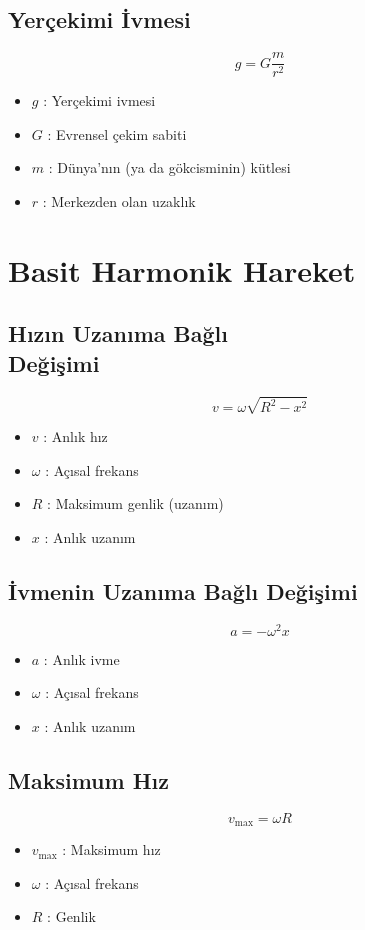 \documentclass[a4paper, 11pt, titlepage]{article}
\begin{document}
\subsection{Yerçekimi İvmesi}
\[
g = G \frac{m}{r^2}
\]
\begin{itemize}
  \item $g$ : Yerçekimi ivmesi
  \item $G$ : Evrensel çekim sabiti
  \item $m$ : Dünya'nın (ya da gökcisminin) kütlesi
  \item $r$ : Merkezden olan uzaklık
\end{itemize}
 \section{Basit Harmonik Hareket}
 \subsection[Hızın Uzanıma Bağlı Değişimi]{Hızın Uzanıma Bağlı \\Değişimi}
 \[
 v = \omega \sqrt{R^2 - x^2}
 \]
 \begin{itemize}
   \item $v$ : Anlık hız
   \item $\omega$ : Açısal frekans
   \item $R$ : Maksimum genlik (uzanım)
   \item $x$ : Anlık uzanım
 \end{itemize}

\subsection{İvmenin Uzanıma Bağlı Değişimi}
\[
a = -\omega^2 x
\]
\begin{itemize}
  \item $a$ : Anlık ivme
  \item $\omega$ : Açısal frekans
  \item $x$ : Anlık uzanım
\end{itemize}

\subsection{Maksimum Hız}
\[
v_{\mathrm{max}} = \omega R
\]
\begin{itemize}
  \item $v_{\mathrm{max}}$ : Maksimum hız
  \item $\omega$ : Açısal frekans
  \item $R$ : Genlik
\end{itemize}
\end{document}
